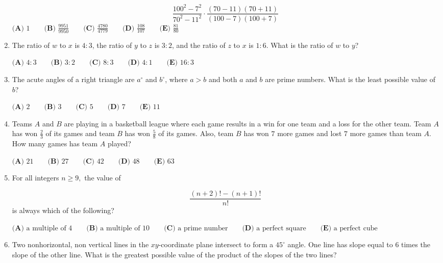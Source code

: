 \documentclass{article}
\begin{document}
\begin{enumerate}[label=\arabic*., itemsep=0.5em]
\begin{equation*}
\frac{100^2-7^2}{70^2-11^2} \cdot \frac{(70-11)(70+11)}{(100-7)(100+7)}
\end{equation*}
\(\textbf{(A) } 1 \qquad \textbf{(B) } \frac{9951}{9950} \qquad \textbf{(C) } \frac{4780}{4779} \qquad \textbf{(D) } \frac{108}{107} \qquad \textbf{(E) } \frac{81}{80} \)\par \vspace{0.5em}\item The ratio of \(w\) to \(x\) is \(4 : 3\), the ratio of \(y\) to \(z\) is \(3 : 2\), and the ratio of \(z\) to \(x\) is \(1 : 6\). What is the ratio of \(w\) to \(y\)?

\(\textbf{(A) }4:3 \qquad \textbf{(B) }3:2 \qquad \textbf{(C) } 8:3 \qquad \textbf{(D) } 4:1 \qquad \textbf{(E) } 16:3 \)\par \vspace{0.5em}\item The acute angles of a right triangle are \(a^{\circ}\) and \(b^{\circ}\), where \(a>b\) and both \(a\) and \(b\) are prime numbers. What is the least possible value of \(b\)?

\(\textbf{(A) }2\qquad\textbf{(B) }3\qquad\textbf{(C) }5\qquad\textbf{(D) }7\qquad\textbf{(E) }11\)\par \vspace{0.5em}\item Teams \(A\) and \(B\) are playing in a basketball league where each game results in a win for one team and a loss for the other team. Team \(A\) has won \(\tfrac{2}{3}\) of its games and team \(B\) has won \(\tfrac{5}{8}\) of its games. Also, team \(B\) has won \(7\) more games and lost \(7\) more games than team \(A.\) How many games has team \(A\) played?

\(\textbf{(A) } 21 \qquad \textbf{(B) } 27 \qquad \textbf{(C) } 42 \qquad \textbf{(D) } 48 \qquad \textbf{(E) } 63\)\par \vspace{0.5em}\item For all integers \(n \geq 9,\) the value of

\begin{equation*}
\frac{(n+2)!-(n+1)!}{n!}
\end{equation*}
is always which of the following?

\(\textbf{(A) } \text{a multiple of 4} \qquad \textbf{(B) } \text{a multiple of 10} \qquad \textbf{(C) } \text{a prime number} \qquad \textbf{(D) } \text{a perfect square} \qquad \textbf{(E) } \text{a perfect cube}\)\par \vspace{0.5em}\item Two nonhorizontal, non vertical lines in the \(xy\)-coordinate plane intersect to form a \(45^{\circ}\) angle. One line has slope equal to \(6\) times the slope of the other line. What is the greatest possible value of the product of the slopes of the two lines?


\end{enumerate}
\end{document}

